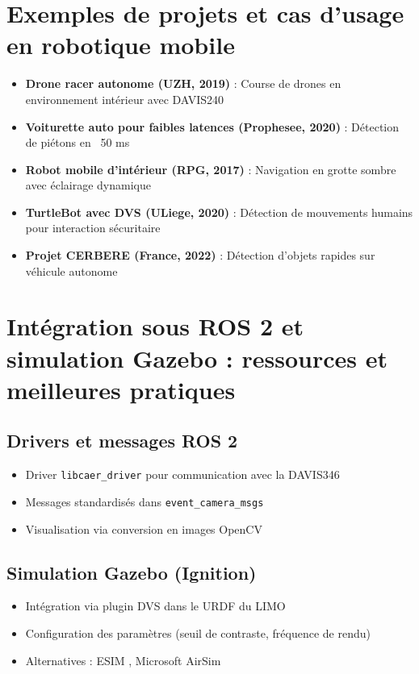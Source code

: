 \section{Exemples de projets et cas d'usage en robotique mobile}
\begin{itemize}
\item \textbf{Drone racer autonome (UZH, 2019)} : Course de drones en environnement intérieur avec DAVIS240 \cite{mueggler2017event}
\item \textbf{Voiturette auto pour faibles latences (Prophesee, 2020)} : Détection de piétons en ~50 ms \cite{nature2024lowlatency}
\item \textbf{Robot mobile d'intérieur (RPG, 2017)} : Navigation en grotte sombre avec éclairage dynamique
\item \textbf{TurtleBot avec DVS (ULiege, 2020)} : Détection de mouvements humains pour interaction sécuritaire \cite{csdn2021ros}
\item \textbf{Projet CERBERE (France, 2022)} : Détection d'objets rapides sur véhicule autonome \cite{anr2022cerbere}
\end{itemize}

\section{Intégration sous ROS 2 et simulation Gazebo : ressources et meilleures pratiques}
\subsection{Drivers et messages ROS 2}
\begin{itemize}
\item Driver \texttt{libcaer\_driver} pour communication avec la DAVIS346 \cite{rosevent2024libcaer}
\item Messages standardisés dans \texttt{event\_camera\_msgs} \cite{rosevent2024eventcamera}
\item Visualisation via conversion en images OpenCV
\end{itemize}

\subsection{Simulation Gazebo (Ignition)}
\begin{itemize}
\item Intégration via plugin DVS dans le URDF du LIMO \cite{hbp2024gazebo}
\item Configuration des paramètres (seuil de contraste, fréquence de rendu)
\item Alternatives : ESIM \cite{mueggler2017event}, Microsoft AirSim
\end{itemize}

